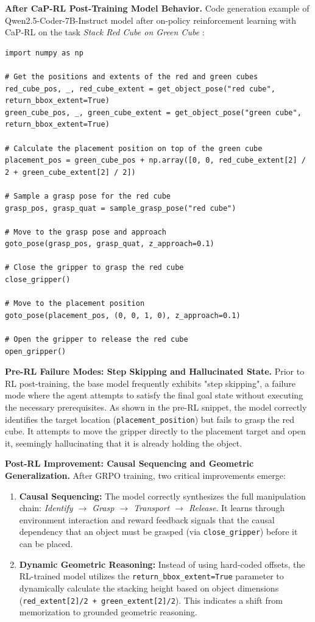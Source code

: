 \textbf{After CaP-RL Post-Training Model Behavior.} Code generation example of Qwen2.5-Coder-7B-Instruct model after on-policy reinforcement learning with CaP-RL on the task \textit{Stack Red Cube on Green Cube} :
\begin{lstlisting}
import numpy as np

# Get the positions and extents of the red and green cubes
red_cube_pos, _, red_cube_extent = get_object_pose("red cube", return_bbox_extent=True)
green_cube_pos, _, green_cube_extent = get_object_pose("green cube", return_bbox_extent=True)

# Calculate the placement position on top of the green cube
placement_pos = green_cube_pos + np.array([0, 0, red_cube_extent[2] / 2 + green_cube_extent[2] / 2])

# Sample a grasp pose for the red cube
grasp_pos, grasp_quat = sample_grasp_pose("red cube")

# Move to the grasp pose and approach
goto_pose(grasp_pos, grasp_quat, z_approach=0.1)

# Close the gripper to grasp the red cube
close_gripper()

# Move to the placement position
goto_pose(placement_pos, (0, 0, 1, 0), z_approach=0.1)

# Open the gripper to release the red cube
open_gripper()
\end{lstlisting}


\textbf{Pre-RL Failure Modes: Step Skipping and Hallucinated State.}
Prior to RL post-training, the base model frequently exhibits "step skipping", a failure mode where the agent attempts to satisfy the final goal state without executing the necessary prerequisites. As shown in the pre-RL snippet, the model correctly identifies the target location (\texttt{placement\_position}) but fails to grasp the red cube. It attempts to move the gripper directly to the placement target and open it, seemingly hallucinating that it is already holding the object.

\textbf{Post-RL Improvement: Causal Sequencing and Geometric Generalization.}
After GRPO training, two critical improvements emerge:
\begin{enumerate}
    \item \textbf{Causal Sequencing:} The model correctly synthesizes the full manipulation chain: \textit{Identify $\rightarrow$ Grasp $\rightarrow$ Transport $\rightarrow$ Release}. It learns through environment interaction and reward feedback signals that the causal dependency that an object must be grasped (via \texttt{close\_gripper}) before it can be placed.
    \item \textbf{Dynamic Geometric Reasoning:} Instead of using hard-coded offsets, the RL-trained model utilizes the \texttt{return\_bbox\_extent=True} parameter to dynamically calculate the stacking height based on object dimensions (\texttt{red\_extent[2]/2 + green\_extent[2]/2}). This indicates a shift from memorization to grounded geometric reasoning.
\end{enumerate}


